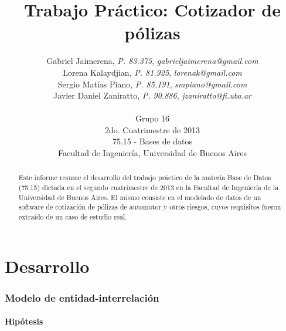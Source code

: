 \documentclass[a4paper,11pt]{article}
\title{\textbf{Trabajo Práctico: Cotizador de pólizas}}
\author{
  Gabriel Jaimerena,      \textit{P. 83.375},	\textit{gabrieljaimerena@gmail.com}	            \\
  Lorena Kalaydjian,     \textit{P. 81.925},	\textit{lorenak@gmail.com}                		\\
  Sergio Matías Piano,     \textit{P. 85.191},	\textit{smpiano@gmail.com}                  	\\
  Javier Daniel Zaniratto, \textit{P. 90.886},	\textit{jzaniratto@fi.uba.ar}                   \\
  \\
  \normalsize{Grupo 16}                        			  			\\
  \normalsize{2do. Cuatrimestre de 2013}                           	\\
  \normalsize{75.15 - Bases de datos}                              	\\
  \normalsize{Facultad de Ingeniería, Universidad de Buenos Aires}
}
\date{}
\begin{document}
\thispagestyle{empty}
\maketitle

\begin{abstract}

  Este informe resume el desarrollo del trabajo práctico de la materia Base
  de Datos (75.15) dictada en el segundo cuatrimestre de 2013 en la Facultad de
  Ingeniería de la Universidad de Buenos Aires. El mismo consiste en el
  modelado de datos de un software de cotización de pólizas de automotor y otros riesgos,
  cuyos requisitos fueron extraído de un caso de estudio real.

\end{abstract}

\clearpage

\tableofcontents
\clearpage


\part{Desarrollo}


\section{Modelo de entidad-interrelación} \label{sec:der}

\subsection{Hipótesis}
\end{document}
